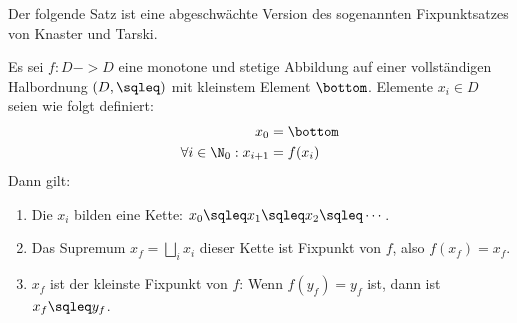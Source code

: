 Der folgende Satz ist eine abgeschwächte Version des sogenannten
Fixpunktsatzes von Knaster und Tarski.

\begin{satz}
  Es sei $f:D->D$ eine monotone und stetige Abbildung auf einer
  vollständigen Halbordnung $(D,\sqleq)$ mit kleinstem Element
  $\bottom$. Elemente $x_i\in D$ seien wie folgt definiert:
  \begin{align*}
    x_0 &= \bottom \\
    \forall i\in\N_0: x_{i+1} &= f(x_i) 
  \end{align*}
  Dann gilt:
  \begin{enumerate}
  \item Die $x_i$ bilden eine Kette: $x_0 \sqleq x_1\sqleq x_2 \sqleq
    \cdots$.
  \item Das Supremum $x_f=\bigsqcup_i x_i$ dieser Kette ist Fixpunkt von
    $f$, also $f(x_f)=x_f$.
  \item $x_f$ ist der kleinste Fixpunkt von $f$: Wenn $f(y_f)=y_f$
    ist, dann ist $x_f\sqleq y_f$.
  \end{enumerate}
\end{satz}

